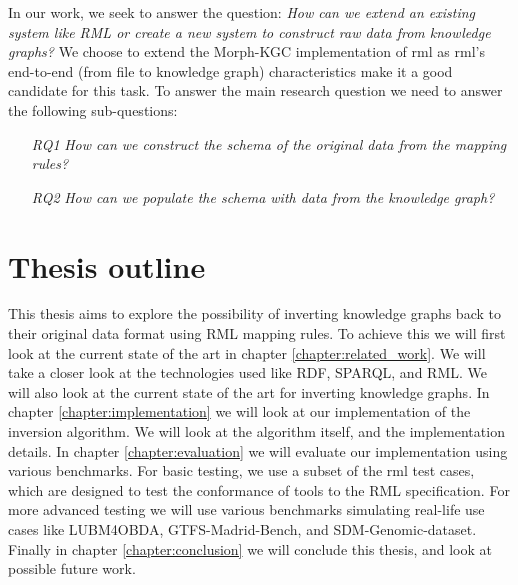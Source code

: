 In our work, we seek to answer the question: \textit{How can we extend an existing system like RML or create a new system to construct
raw data from knowledge graphs?} We choose to extend the Morph-KGC implementation \citep{arenas2022morph} of \acrshort{rml} \citep{dimou_ldow_2014} as \acrshort{rml}'s end-to-end (from file to knowledge graph) characteristics make it a good candidate for this task. To answer the main research question we need to answer the following sub-questions:
\begin{itemize}
    \item[\textit{RQ1}] \textit{How can we construct the schema of the original data from the mapping rules?}
    \item[\textit{RQ2}] \textit{How can we populate the schema with data from the knowledge graph?}
\end{itemize}

\section{Thesis outline}
This thesis aims to explore the possibility of inverting knowledge graphs back to their original data format using RML mapping rules. To achieve this we will first look at the current state of the art in chapter \ref{chapter:related_work}. We will take a closer look at the technologies used like RDF, SPARQL, and RML. We will also look at the current state of the art for inverting knowledge graphs. In chapter \ref{chapter:implementation} we will look at our implementation of the inversion algorithm. We will look at the algorithm itself, and the implementation details. In chapter \ref{chapter:evaluation} we will evaluate our implementation using various benchmarks. For basic testing, we use a subset of the rml test cases, which are designed to test the conformance of tools to the RML specification. For more advanced testing we will use various benchmarks simulating real-life use cases like LUBM4OBDA, GTFS-Madrid-Bench, and SDM-Genomic-dataset. Finally in chapter \ref{chapter:conclusion} we will conclude this thesis, and look at possible future work.
